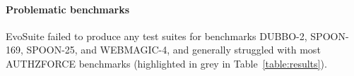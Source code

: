 \documentclass[sigconf,table]{acmart}
\newcommand{\EVOSUITE}{{\sc EvoSuite}\xspace}
\begin{document}







\paragraph{Problematic benchmarks}

\EVOSUITE failed to produce any test suites for benchmarks DUBBO-2, SPOON-169,
SPOON-25, and WEBMAGIC-4, and generally struggled with most AUTHZFORCE
benchmarks (highlighted in grey in Table~\ref{table:results}).
\end{document}
